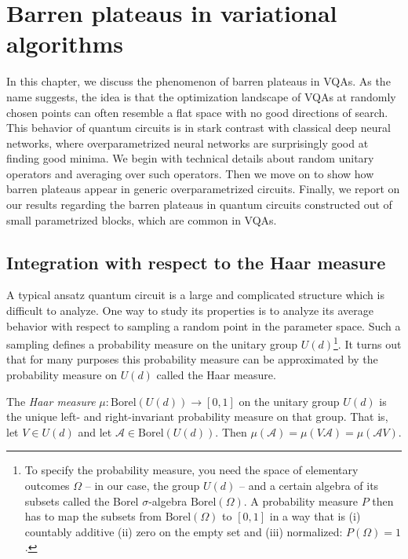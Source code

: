 \chapter{Barren plateaus in variational algorithms}
\label{chap:plateaus}

In this chapter, we discuss the phenomenon of barren plateaus in VQAs. As the name suggests, the idea is that the optimization landscape of VQAs at randomly chosen points can often resemble a flat space with no good directions of search. This behavior of quantum circuits is in stark contrast with classical deep neural networks, where overparametrized neural networks are surprisingly good at finding good minima. We begin with technical details about random unitary operators and averaging over such operators. Then we move on to show how barren plateaus appear in generic overparametrized circuits. Finally, we report on our results regarding the barren plateaus in quantum circuits constructed out of small parametrized blocks, which are common in VQAs.

\section{Integration with respect to the Haar measure}

A typical ansatz quantum circuit is a large and complicated structure which is difficult to analyze. One way to study its properties is to analyze its average behavior with respect to sampling a random point in the parameter space. Such a sampling defines a probability measure on the unitary group $U(d)$\footnote{To specify the probability measure, you need the space of elementary outcomes $\Omega$ -- in our case, the group $U(d)$ -- and a certain algebra of its subsets called the Borel $\sigma$-algebra $\mathrm{Borel} (\Omega)$. A probability measure $P$ then has to map the subsets from $\mathrm{Borel} (\Omega)$ to $[0, 1]$ in a way that is (i) countably additive (ii) zero on the empty set and (iii) normalized: $P(\Omega) = 1$.}. 
It turns out that for many purposes this probability measure can be approximated by the probability measure on $U(d)$ called the Haar measure.

\begin{definition}
    The \textit{Haar measure} $\mu: \mathrm{Borel} (U(d)) \rightarrow [0, 1]$ on the unitary group $U(d)$ is the unique left- and right-invariant probability measure on that group. That is, let $V \in U(d)$ and let $\mathcal{A} \in \mathrm{Borel} (U(d))$. Then $\mu(\mathcal{A}) = \mu(V \mathcal{A}) = \mu(\mathcal{A} V)$.
\end{definition}

